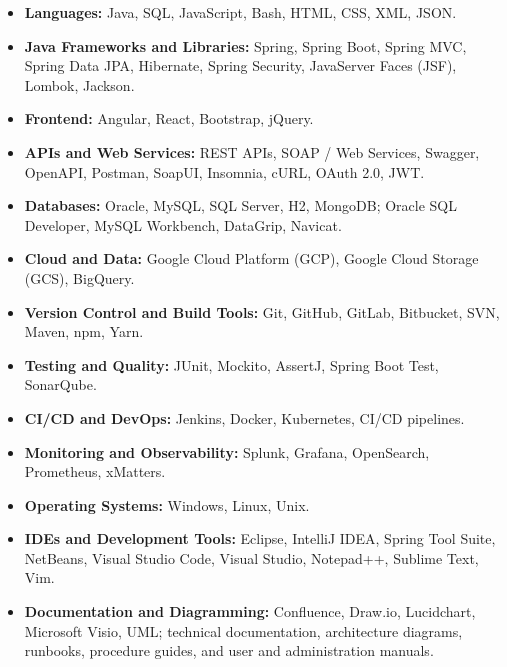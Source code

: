 \documentclass[10pt,letterpaper]{article}
\begin{document}
\begin{itemize}

    \item \textbf{Languages:}
    Java, SQL, JavaScript, Bash, HTML, CSS, XML, JSON.

    \item \textbf{Java Frameworks and Libraries:}
    Spring, Spring Boot, Spring MVC, Spring Data JPA, Hibernate,
    Spring Security, JavaServer Faces (JSF), Lombok, Jackson.

    \item \textbf{Frontend:}
    Angular, React, Bootstrap, jQuery.

    \item \textbf{APIs and Web Services:}
    REST APIs, SOAP / Web Services, Swagger, OpenAPI,
    Postman, SoapUI, Insomnia, cURL, OAuth 2.0, JWT.

    \item \textbf{Databases:}
    Oracle, MySQL, SQL Server, H2, MongoDB;
    Oracle SQL Developer, MySQL Workbench, DataGrip, Navicat.

    \item \textbf{Cloud and Data:}
    Google Cloud Platform (GCP), Google Cloud Storage (GCS), BigQuery.

    \item \textbf{Version Control and Build Tools:}
    Git, GitHub, GitLab, Bitbucket, SVN, Maven, npm, Yarn.

    \item \textbf{Testing and Quality:}
    JUnit, Mockito, AssertJ, Spring Boot Test, SonarQube.

    \item \textbf{CI/CD and DevOps:}
    Jenkins, Docker, Kubernetes, CI/CD pipelines.

    \item \textbf{Monitoring and Observability:}
    Splunk, Grafana, OpenSearch, Prometheus, xMatters.

    \item \textbf{Operating Systems:}
    Windows, Linux, Unix.

    \item \textbf{IDEs and Development Tools:}
    Eclipse, IntelliJ IDEA, Spring Tool Suite, NetBeans,
    Visual Studio Code, Visual Studio, Notepad++, Sublime Text, Vim.

    \item \textbf{Documentation and Diagramming:}
    Confluence, Draw.io, Lucidchart, Microsoft Visio, UML;
    technical documentation, architecture diagrams, runbooks,
    procedure guides, and user and administration manuals.


\end{itemize}
\end{document}
